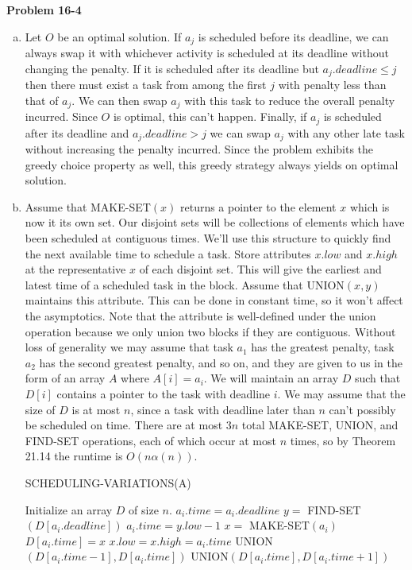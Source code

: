 \documentclass{article}
\begin{document}
\noindent\textbf{Problem 16-4}\\

\begin{enumerate}[a.]
\item Let $O$ be an optimal solution.  If $a_j$ is scheduled before its deadline, we can always swap it with whichever activity is scheduled at its deadline without changing the penalty.  If it is scheduled after its deadline but $a_j.deadline \leq j$ then there must exist a task from among the first $j$ with penalty less than that of $a_j$.  We can then swap $a_j$ with this task to reduce the overall penalty incurred.  Since $O$ is optimal, this can't happen.  Finally, if $a_j$ is scheduled after its deadline and $a_j.deadline > j$ we can swap $a_j$ with any other late task without increasing the penalty incurred.  Since the problem exhibits the greedy choice property as well, this greedy strategy always yields on optimal solution. \\

\item Assume that MAKE-SET$(x)$ returns a pointer to the element $x$ which is now it its own set.  Our disjoint sets will be collections of elements which have been scheduled at contiguous times.  We'll use this structure to quickly find the next available time to schedule a task. Store attributes $x.low$ and $x.high$ at the representative $x$ of each disjoint set.  This will give the earliest and latest time of a scheduled task in the block.  Assume that UNION$(x,y)$ maintains this attribute.  This can be done in constant time, so it won't affect the asymptotics. Note that the attribute is well-defined under the union operation because we only union two blocks if they are contiguous.  Without loss of generality we may assume that task $a_1$ has the greatest penalty, task $a_2$ has the second greatest penalty, and so on, and they are given to us in the form of an array $A$ where $A[i] = a_i$. We will maintain an array $D$ such that $D[i]$ contains a pointer to the task with deadline $i$. We may assume that the size of $D$ is at most $n$, since a task with deadline later than $n$ can't possibly be scheduled on time.  There are at most $3n$ total MAKE-SET, UNION, and FIND-SET operations, each of which occur at most $n$ times, so by Theorem 21.14 the runtime is $O(n \alpha(n))$.  \\

\begin{algorithm}
\caption{SCHEDULING-VARIATIONS(A)}
\begin{algorithmic}[1]
\State Initialize an array $D$ of size $n$. 
	\State $a_i.time = a_i.deadline$
		\State $y = $ FIND-SET$(D[a_i.deadline])$
		\State $a_i.time = y.low - 1$
	\EndIf
	\State $x = $ MAKE-SET$(a_i)$
	\State $D[a_i.time] = x$
	\State $x.low = x.high = a_i.time$
		\State UNION$(D[a_i.time - 1], D[a_i.time])$
	\EndIf
		\State UNION$(D[a_i.time], D[a_i.time + 1])$
	\EndIf
\EndFor
\end{algorithmic}
\end{algorithm}
\end{enumerate}
\end{document}
